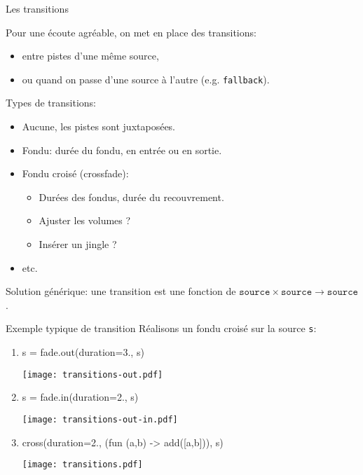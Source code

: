 \documentclass{beamer}
\renewcommand{\emph}[1]{\alert{#1}}
\begin{document}
\begin{ssl}{Les transitions}

Pour une écoute agréable, on met en place des \emph{transitions}:
\begin{itemize}
  \item entre pistes d'une même source,
  \item ou quand on passe d'une source à l'autre (e.g. \texttt{fallback}).
\end{itemize}

Types de transitions:
\begin{itemize}
\item Aucune, les pistes sont juxtaposées.
\item Fondu: durée du fondu, en entrée ou en sortie.
\item Fondu croisé (\emph{crossfade}):
 \begin{itemize}
   \item Durées des fondus, durée du recouvrement.
   \item Ajuster les volumes ?
   \item Insérer un jingle ?
 \end{itemize}
\item etc.
\end{itemize}

Solution générique: une transition est une fonction de
$\mathtt{source} \times \mathtt{source} \rightarrow \mathtt{source}$.
\end{ssl}

\begin{ssl}{Exemple typique de transition}
Réalisons un fondu croisé sur la source \texttt{s}:
\begin{semiverbatim}
\begin{enumerate}
\item s = fade.out(duration=3., s)
  \begin{center}
  \texttt{[image: transitions-out.pdf]}
  \end{center}
\item s = fade.in(duration=2., s)
  \begin{center}
  \texttt{[image: transitions-out-in.pdf]}
  \end{center}
\item cross(duration=2., (fun (a,b) -> add([a,b])), s)
  \begin{center}
  \texttt{[image: transitions.pdf]}
  \end{center}
\end{enumerate}
\end{semiverbatim}
\end{ssl}
\end{document}
